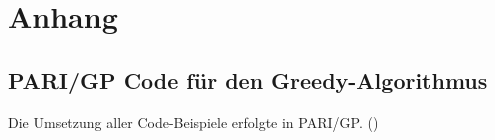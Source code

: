 \section{Anhang}
\subsection{PARI/GP Code für den Greedy-Algorithmus}\label{code:greedy}
Die Umsetzung aller Code-Beispiele erfolgte in PARI/GP. (\cite{PARI2018})

